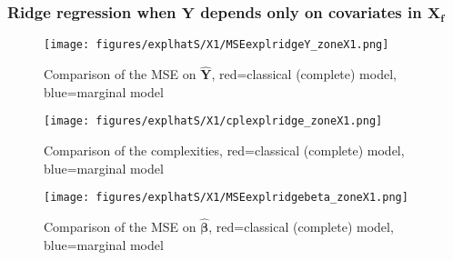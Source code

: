 \documentclass[12pt,a4paper]{report}
\begin{document}
\subsubsection{Ridge regression when $\boldsymbol{Y}$ depends only on covariates in $\boldsymbol{X_f}$}
	
\begin{figure}[h!]
	\centering
		  \texttt{[image: figures/explhatS/X1/MSEexplridgeY\_zoneX1.png]}
		\caption{Comparison of the MSE on $\hat{\boldsymbol{Y}}$, red=classical (complete) model, blue=marginal model}\label{MSEexplridgeY_zoneX1}
	\end{figure}
	\begin{figure}[h!]
	\centering
		  \texttt{[image: figures/explhatS/X1/cplexplridge\_zoneX1.png]}
		\caption{Comparison of the complexities, red=classical (complete) model, blue=marginal model}\label{cplexplridge_zoneX1}
	\end{figure}
	\begin{figure}[h!]
	\centering
		  \texttt{[image: figures/explhatS/X1/MSEexplridgebeta\_zoneX1.png]}
		\caption{Comparison of the MSE on $\hat{\boldsymbol{\beta}}$, red=classical (complete) model, blue=marginal model}\label{MSEexplridgebeta_zoneX1}
	\end{figure}
	\FloatBarrier
\end{document}
